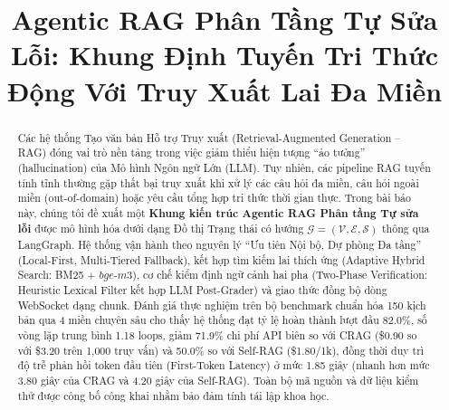 \documentclass[conference]{IEEEtran}
\begin{document}
\raggedbottom

\title{Agentic RAG Phân Tầng Tự Sửa Lỗi: Khung Định Tuyến Tri Thức Động Với Truy Xuất Lai Đa Miền}

\author{
  \and
}

\maketitle

\begin{abstract}
Các hệ thống Tạo văn bản Hỗ trợ Truy xuất (Retrieval-Augmented Generation -- RAG) đóng vai trò nền tảng trong việc giảm thiểu hiện tượng ``ảo tưởng'' (hallucination) của Mô hình Ngôn ngữ Lớn (LLM). Tuy nhiên, các pipeline RAG tuyến tính tĩnh thường gặp thất bại truy xuất khi xử lý các câu hỏi đa miền, câu hỏi ngoài miền (out-of-domain) hoặc yêu cầu tổng hợp tri thức thời gian thực. Trong bài báo này, chúng tôi đề xuất một \textbf{Khung kiến trúc Agentic RAG Phân tầng Tự sửa lỗi} được mô hình hóa dưới dạng Đồ thị Trạng thái có hướng $\mathcal{G} = (\mathcal{V}, \mathcal{E}, \mathcal{S})$ thông qua LangGraph. Hệ thống vận hành theo nguyên lý ``Ưu tiên Nội bộ, Dự phòng Đa tầng'' (Local-First, Multi-Tiered Fallback), kết hợp tìm kiếm lai thích ứng (Adaptive Hybrid Search: BM25 + $bge\text{-}m3$), cơ chế kiểm định ngữ cảnh hai pha (Two-Phase Verification: Heuristic Lexical Filter kết hợp LLM Post-Grader) và giao thức đồng bộ dòng WebSocket dạng chunk. Đánh giá thực nghiệm trên bộ benchmark chuẩn hóa 150 kịch bản qua 4 miền chuyên sâu cho thấy hệ thống đạt tỷ lệ hoàn thành lượt đầu 82.0\%, số vòng lặp trung bình 1.18 loops, giảm 71.9\% chi phí API biên so với CRAG (\$0.90 so với \$3.20 trên 1,000 truy vấn) và 50.0\% so với Self-RAG (\$1.80/1k), đồng thời duy trì độ trễ phản hồi token đầu tiên (First-Token Latency) ở mức 1.85 giây (nhanh hơn mức 3.80 giây của CRAG và 4.20 giây của Self-RAG). Toàn bộ mã nguồn và dữ liệu kiểm thử được công bố công khai nhằm bảo đảm tính tái lập khoa học.
\end{abstract}
\end{document}
